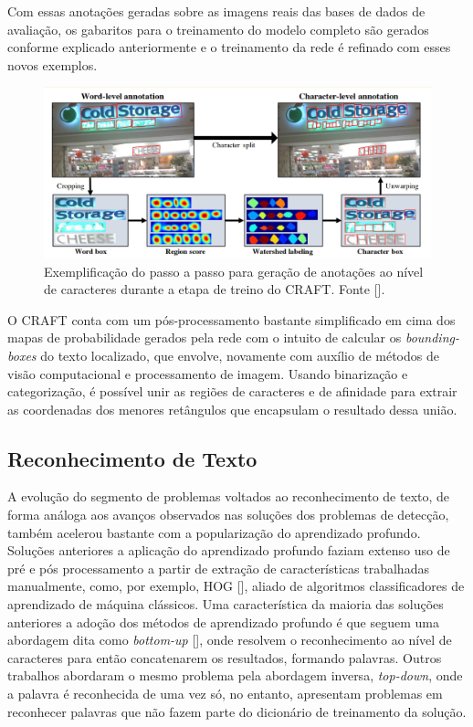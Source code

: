 Com essas anotações geradas sobre as imagens reais das bases de dados de avaliação, os gabaritos para o treinamento do modelo completo são gerados 
conforme explicado anteriormente e o treinamento da rede é refinado com esses novos exemplos.

\begin{figure}
    \centering
    \includegraphics[width=\textwidth]{figs/craft-char-level-annotation.png}
    \caption{Exemplificação do passo a passo para geração de anotações ao nível de caracteres durante a etapa de treino do CRAFT. Fonte [].}
    \label{fig:craft_char_level_annotation}
\end{figure}

O CRAFT conta com um pós-processamento bastante simplificado em cima dos mapas de probabilidade gerados pela rede com o intuito de calcular os 
\textit{bounding-boxes} do texto localizado, que envolve, novamente com auxílio de métodos de visão computacional e processamento de imagem. Usando 
binarização e categorização, é possível unir as regiões de caracteres e de afinidade para extrair as coordenadas dos menores retângulos que 
encapsulam o resultado dessa união.


\subsection{Reconhecimento de Texto}
A evolução do segmento de problemas voltados ao reconhecimento de texto, de forma análoga aos avanços observados nas soluções dos problemas de 
detecção, também acelerou bastante com a popularização do aprendizado profundo. Soluções anteriores a aplicação do aprendizado profundo faziam 
extenso uso de pré e pós processamento a partir de extração de características trabalhadas manualmente, como, por exemplo, HOG [], 
aliado de algoritmos classificadores de aprendizado de máquina clássicos. Uma característica da maioria das soluções anteriores a adoção dos métodos 
de aprendizado profundo é que seguem uma abordagem dita como \textit{bottom-up} [], onde resolvem o reconhecimento ao nível 
de caracteres para então concatenarem os resultados, formando palavras. Outros trabalhos abordaram o mesmo problema pela abordagem inversa, \textit{top-down}, 
onde a palavra é reconhecida de uma vez só, no entanto, apresentam problemas em reconhecer palavras que não fazem parte do dicionário de treinamento da solução.

